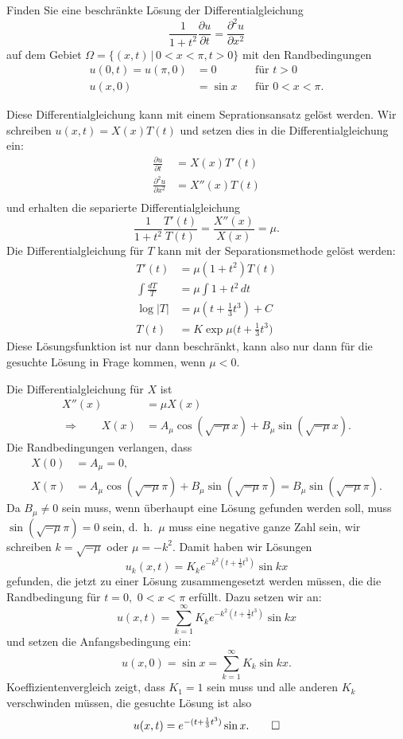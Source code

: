 Finden Sie eine beschränkte Lösung der Differentialgleichung
\begin{equation}
\frac1{1+t^2}\frac{\partial u}{\partial t}=\frac{\partial^2 u}{\partial x^2}
\label{40000010:dgl}
\end{equation}
auf dem Gebiet $\Omega=\{(x,t)\,|\, 0<x<\pi,t>0\}$ 
mit den Randbedingungen
\begin{align*}
u(0,t)=u(\pi,0)&=0&&\text{für $t > 0$}\\
u(x,0)&=\sin x&&\text{für $0<x<\pi$}.
\end{align*}

\begin{loesung}
Diese Differentialgleichung kann mit einem Seprationsansatz gelöst werden.
Wir schreiben $u(x,t)=X(x)T(t)$ und setzen dies in die Differentialgleichung
ein:
\begin{align*}
\frac{\partial u}{\partial t}&=X(x)T'(t)\\
\frac{\partial^2 u}{\partial x^2}&=X''(x)T(t)\\
\end{align*}
und erhalten die separierte Differentialgleichung
\[
\frac1{1+t^2}\frac{T'(t)}{T(t)}=\frac{X''(x)}{X(x)}=\mu.
\]
Die Differentialgleichung für $T$ kann mit der Separationsmethode
gelöst werden:
\begin{align*}
T'(t)&=\mu (1+t^2)T(t)\\
\int\frac{dT}{T}&=\mu\int 1+t^2\,dt\\
\log|T|&=\mu(t+\frac13t^3) +C\\
T(t)&=K\exp\mu\biggl(t+\frac13t^3\biggr)
\end{align*}
Diese Lösungsfunktion ist nur dann beschränkt, kann also nur dann
für die gesuchte Lösung in Frage kommen, wenn $\mu <0$.

Die Differentialgleichung für $X$ ist
\begin{align*}
X''(x)&=\mu X(x)\\
\Rightarrow\qquad
X(x)&=A_\mu \cos(\sqrt{-\mu}x) + B_\mu\sin(\sqrt{-\mu}x).
\end{align*}
Die Randbedingungen verlangen, dass
\begin{align*}
X(0)&=A_\mu=0,\\
X(\pi)&=A_\mu\cos(\sqrt{-\mu}\pi)+B_\mu\sin(\sqrt{-\mu}\pi)=B_\mu\sin(\sqrt{-\mu}\pi).
\end{align*}
Da $B_\mu\ne 0$ sein muss, wenn überhaupt eine Lösung gefunden werden
soll, muss $\sin(\sqrt{-\mu}\pi)=0$ sein, d.~h.~$\mu$ muss eine negative ganze
Zahl sein, wir schreiben $k=\sqrt{-\mu}$ oder $\mu=-k^2$.
Damit haben wir Lösungen
\[
u_k(x,t)=K_k e^{-k^2(t+\frac13t^3)}\sin kx
\]
gefunden, die jetzt zu einer Lösung zusammengesetzt werden müssen, die
die Randbedingung für $t=0,$ $0<x<\pi$ erfüllt. Dazu setzen wir an:
\[
u(x,t)=\sum_{k=1}^\infty K_k e^{-k^2(t+\frac13t^3)}\sin kx
\]
und setzen die Anfangsbedingung ein:
\[
u(x,0)=\sin x=\sum_{k=1}^\infty K_k \sin kx.
\]
Koeffizientenvergleich zeigt, dass $K_1=1$ sein muss und alle anderen $K_k$
verschwinden müssen, die gesuchte Lösung ist also
\[
u(x,t)=e^{-(t+\frac13t^3)}\sin x.
\qedhere
\]
\end{loesung}


